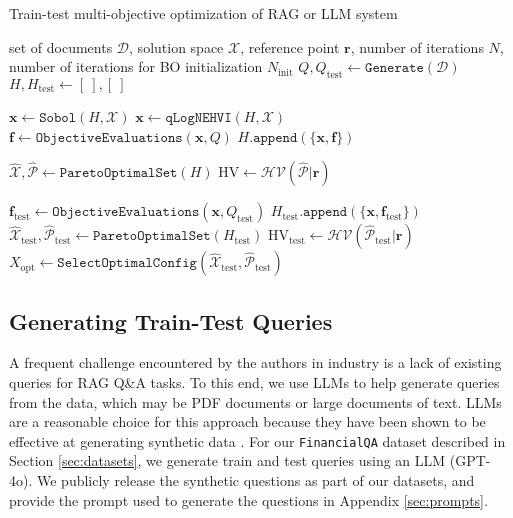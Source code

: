 \begin{algorithm}
\caption{Train-test multi-objective optimization of RAG or LLM system}\label{alg:1}
\begin{algorithmic}[1]
\Require set of documents $\mathcal{D}$, solution space $\mathcal{X}$, reference point $\mathbf{r}$, number of iterations $N$, number of iterations for BO initialization $N_{\text{init}}$ 
\State $Q, Q_{\text{test}} \gets \texttt{Generate}(\mathcal{D})$ 
\State $H, H_{\text{test}}\gets [~], [~]$ 

 
    \State $\mathbf{x} \gets \texttt{Sobol}(H, \mathcal{X})$ 
\Else
    \State $\mathbf{x} \gets \texttt{qLogNEHVI}(H, \mathcal{X})$ 
\EndIf
\State $\mathbf{f} \gets  \texttt{ObjectiveEvaluations}(\mathbf{x}, Q)$ 
\State $H.\texttt{append} (\{\mathbf{x}, \mathbf{f}\})$ 

\State $\mathcal{\hat{X}}, \mathcal{\hat{P}} \gets \texttt{ParetoOptimalSet} (H)$ 
\State $\text{HV} \gets \mathcal{HV} (\mathcal{\hat{P}} | \mathbf{r})$ 

\State $\mathbf{f}_{\text{test}} \gets \texttt{ObjectiveEvaluations}(\mathbf{x}, Q_{\text{test}})$ 
\State $H_{\text{test}}.\texttt{append}(\{ \mathbf{x}, \mathbf{f}_{\text{test}}\})$ 
\State $\mathcal{\hat{X}}_\text{test}, \mathcal{\hat{P}}_\text{test} \gets \texttt{ParetoOptimalSet} (H_{\text{test}})$ 
\State $\text{HV}_\text{test} \gets \mathcal{HV} (\mathcal{\hat{P}}_{\text{test}} | \mathbf{r})$ 
\EndFor
\State $X_{\text{opt}} \gets \texttt{SelectOptimalConfig}(\hat{\mathcal{X}}_{\text{test}},\mathcal{\hat{P}}_{\text{test}})$ 
\end{algorithmic}
\end{algorithm}

\subsection{Generating Train-Test Queries}
\label{sec:synthetic_data}
A frequent challenge encountered by the authors in industry is a lack of existing queries for RAG Q\&A tasks.
To this end, we use LLMs to help generate queries from the data, which may be PDF documents or large documents of text. LLMs are a reasonable choice for this approach because they have been shown to be effective at generating synthetic data \citep{long2024llms}.
For our \texttt{FinancialQA} dataset described in Section \ref{sec:datasets}, we generate train and test queries using an LLM (GPT-4o). We publicly release the synthetic questions as part of our datasets, and provide the prompt used to generate the questions in Appendix \ref{sec:prompts}.

